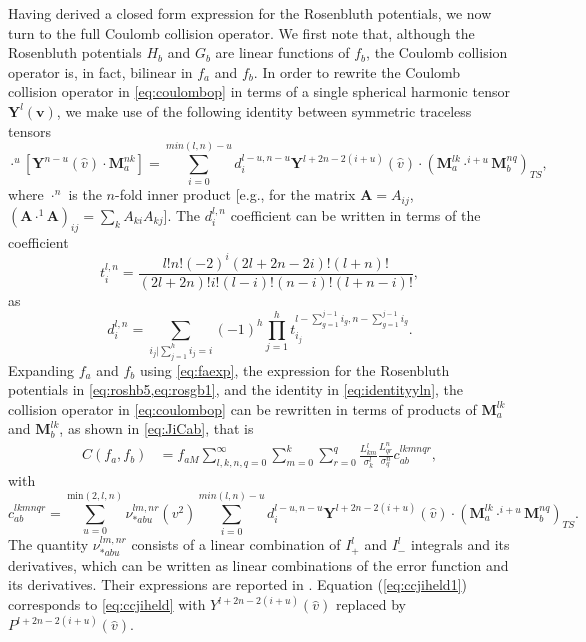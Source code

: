 Having derived a closed form expression for the Rosenbluth potentials, we now turn to the full Coulomb collision operator.
%
We first note that, although the Rosenbluth potentials $H_b$ and $G_b$ are linear functions of $f_b$, the Coulomb collision operator is, in fact, bilinear in $f_a$ and $f_b$.
%
In order to rewrite the Coulomb collision operator in \cref{eq:coulombop} in terms of a single spherical harmonic tensor $\mathbf Y^l(\mathbf v)$, we make use of the following identity between symmetric traceless tensors \citep{Ji2009}
%
\begin{equation}
    [\mathbf Y^{l-u}(\hat v) \cdot \mathbf M_a^{lk}]\cdot^u [\mathbf Y^{n-u}(\hat v) \cdot \mathbf M_a^{nk}]=\sum_{i=0}^{min(l,n)-u}d_i^{l-u,n-u}\mathbf Y^{l+2n-2(i+u)}(\hat v) \cdot \left({\mathbf M_a^{lk} \cdot^{i+u} \mathbf M_b^{nq}}\right)_{TS},
\label{eq:identityyln}
\end{equation}
%
where $\cdot^n$ is the $n$-fold inner product [e.g., for the matrix $\mathbf A = A_{ij}$, $(\mathbf A \cdot^1 \mathbf A)_{ij} = \sum_k A_{ki}A_{kj}$].
%
The $d_i^{l,n}$ coefficient can be written in terms of the coefficient
%
\begin{equation}
    t_i^{l,n}=\frac{l!n!(-2)^i(2l+2n-2i)!(l+n)!}{(2l+2n)!i!(l-i)!(n-i)!(l+n-i)!},
\end{equation}
%
as
%
\begin{equation}
    d_i^{l,n}=\sum_{i_j|\sum_{j=1}^hi_j=i}(-1)^h\prod_{j=1}^h t_{i_j}^{l-\sum_{g=1}^{j-1}i_g,n-\sum_{g=1}^{j-1}i_g}.
\end{equation}
%
Expanding $f_a$ and $f_b$ using \cref{eq:faexp}, the expression for the Rosenbluth potentials in \cref{eq:roshb5,eq:rosgb1}, and the identity in \cref{eq:identityyln}, the collision operator in \cref{eq:coulombop} can be rewritten in terms of products of $\mathbf M_a^{lk}$ and $\mathbf M_b^{lk}$, as shown in \cref{eq:JiCab}, that is
%
\begin{equation}
\begin{split}
    C(f_a,f_b)&=f_{aM}\sum_{l,k,n,q=0}^\infty\sum_{m=0}^k\sum_{r=0}^{q}\frac{L_{km}^l}{\sigma_k^l}\frac{L_{qr}^n}{\sigma_q^n} c_{ab}^{lkmnqr},
\end{split}
\label{eq:JiCab1}
\end{equation}
%
with
%
\begin{equation}
    c_{ab}^{lkmnqr}=\sum_{u=0}^{\text{min}(2,l,n)}\nu_{*abu}^{lm,nr}(v^2)\sum_{i=0}^{min(l,n)-u}d_i^{l-u,n-u}\mathbf Y^{l+2n-2(i+u)}(\hat v) \cdot \left({\mathbf M_a^{lk} \cdot^{i+u} \mathbf M_b^{nq}}\right)_{TS}.
\label{eq:ccjiheld1}
\end{equation}
%
The quantity $\nu_{*abu}^{lm,nr}$ consists of a linear combination of $I_+^l$ and $I_-^l$ integrals and its derivatives, which can be written as linear combinations of the error function and its derivatives.
%
Their expressions are reported in \citet{Ji2009}.
%
Equation (\ref{eq:ccjiheld1}) corresponds to \cref{eq:ccjiheld} with $Y^{l+2n-2(i+u)}(\hat v)$ replaced by $P^{l+2n-2(i+u)}(\hat v)$.

